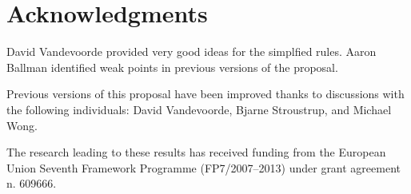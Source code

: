 \section*{Acknowledgments}

David Vandevoorde provided very good ideas for the simplfied rules. Aaron Ballman identified weak
points in previous versions of the proposal.

Previous versions of this proposal have been improved thanks to discussions with the following individuals:
David Vandevoorde,
Bjarne Stroustrup, and
Michael Wong.

The research leading to these results has received funding from the European
Union Seventh Framework Programme (FP7/2007--2013) under grant agreement n.
609666.
